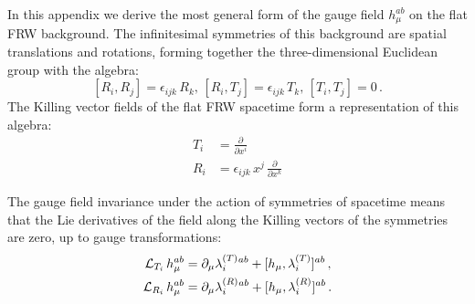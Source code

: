 \documentclass [prd,reprint,eqsecnum,nofootinbib]  {revtex4-1}
\begin{document}
In this appendix we derive the most general form of the gauge field
$h_\mu^{ab}$ on the flat FRW background. The infinitesimal
symmetries of this background are spatial translations and
rotations, forming together the three-dimensional Euclidean group
with the algebra:
\begin{equation}\label{a1}
    [R_i, R_j] = \epsilon_{ijk}\, R_k, \, [R_i, T_j] = \epsilon_{ijk}\, T_k, \, [T_i, T_j]
    =0\, .
\end{equation}
The Killing vector fields of the flat FRW spacetime form a
representation of this algebra:
\begin{align}
T_i &= \frac{\partial}{\partial x^i}\nonumber \\ R_i
&=\epsilon_{ijk}\, x^j \,\frac{\partial}{\partial x^k}\label{a2}
\end{align}

The gauge field invariance under the action of symmetries of
spacetime means that the Lie derivatives of the field along the
Killing vectors of the symmetries are zero, up to gauge
transformations:
\begin{align}
    {\cal L}_{T_i}\,h_\mu^{ab} &= \partial_\mu \lambda^{(T)}_i{}^{ab}
    + [h_\mu,\lambda^{(T)}_i]^{ab}\,,\label{a3}\\  {\cal L}_{R_i}\,h_\mu^{ab} &= \partial_\mu \lambda^{(R)}_i{}^{ab}
    + [h_\mu,\lambda^{(R)}_i]^{ab}\,.\label{a4}
\end{align}
\end{document}
